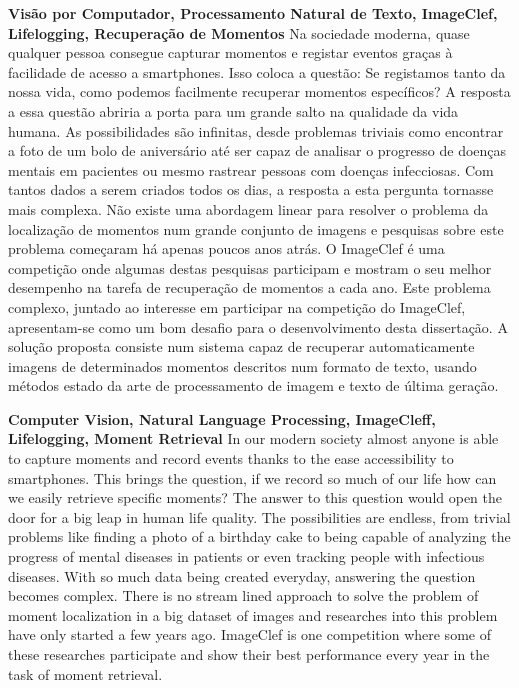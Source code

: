 \TitlePage
  \vspace*{55mm}
       {\textbf{Visão por Computador, Processamento Natural de Texto, ImageClef, Lifelogging, Recuperação de Momentos}}
       {Na sociedade moderna, quase qualquer pessoa consegue capturar momentos e registar eventos graças à facilidade de acesso a smartphones. Isso coloca a questão: Se registamos tanto da nossa vida, como podemos facilmente recuperar momentos específicos? A resposta a essa questão abriria a porta para um grande salto na qualidade da vida humana. As possibilidades são infinitas, desde problemas triviais como encontrar a foto de um bolo de aniversário até ser capaz de analisar o progresso de doenças mentais em pacientes ou mesmo rastrear pessoas com doenças infecciosas.}
     \TEXT{}
          {Com tantos dados a serem criados todos os dias, a resposta a esta pergunta tornasse mais complexa. Não existe uma abordagem linear para resolver o problema da localização de momentos num grande conjunto de imagens e pesquisas sobre este problema começaram há apenas poucos anos atrás. O ImageClef é uma competição onde algumas destas pesquisas participam e mostram o seu melhor desempenho na tarefa de recuperação de momentos a cada ano.}
     \TEXT{}
     {Este problema complexo, juntado ao interesse em participar na competição do ImageClef, apresentam-se como um bom desafio para o desenvolvimento desta dissertação.}
     \TEXT{}
     {A solução proposta consiste num sistema capaz de recuperar automaticamente imagens de determinados momentos descritos num formato de texto, usando métodos estado da arte de processamento de imagem e texto de última geração.} 
\EndTitlePage
\titlepage\ \endtitlepage %

\TitlePage
  \vspace*{55mm}
       {\textbf{Computer Vision, Natural Language Processing, ImageCleff, Lifelogging, Moment Retrieval}}
       {In our modern society almost anyone is able to capture moments and record events thanks to the ease accessibility to smartphones. This brings the question, if we record so much of our life how can we easily retrieve specific moments? The answer to this question would open the door for a big leap in human life quality. The possibilities are endless, from trivial problems like finding a photo of a birthday cake to being capable of analyzing the progress of mental diseases in patients or even tracking people with infectious diseases. }
  \TEXT{}
       {With so much data being created everyday, answering the question becomes complex. There is no stream lined approach to solve the problem of moment localization in a big dataset of images and researches into this problem have only started a few years ago. ImageClef is one competition where some of these researches participate and show their best performance every year in the task of moment retrieval.}


